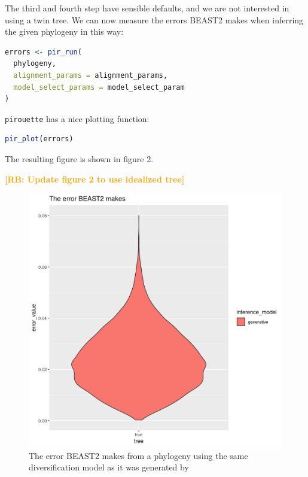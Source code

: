\documentclass{article}
\newcommand{\richel}[1]{\textcolor{orange}{\textbf{[RB: #1]}}}
\begin{document}
The third and fourth step have sensible defaults, and we are not
interested in using a twin tree. We can now measure the errors BEAST2
makes when inferring the given phylogeny in this way:

\begin{lstlisting}[language=R, floatplacement=H]
errors <- pir_run(
  phylogeny,
  alignment_params = alignment_params,
  model_select_params = model_select_param
)
\end{lstlisting}

\verb;pirouette; has a nice plotting function:

\begin{lstlisting}[language=R, floatplacement=H]
pir_plot(errors)
\end{lstlisting}

The resulting figure is shown in figure 2.

\richel{Update figure 2 to use idealized tree}

\begin{figure}[h]
  \includegraphics[width=\textwidth]{figure_2.png}
  \caption{
    The error BEAST2 makes from a phylogeny using the same 
    diversification model as it was generated by
  }
\end{figure}

\end{document}
